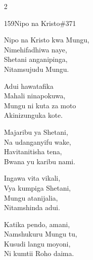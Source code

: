 \begin{multicols}{2}
\begin{hymn}{159}{Nipo na Kristo}{\#371}
\begin{stanza}
Nipo na Kristo kwa Mungu,\\
Nimehifadhiwa naye,\\
Shetani anganipinga,\\
Nitamsujudu Mungu.
\end{stanza}
\begin{chorus}
Adui hawatafika\\
Mahali ninapokuwa,\\
Mungu ni kuta za moto\\
Akinizunguka kote.
\end{chorus}
\begin{stanza}
Majaribu ya Shetani,\\
Na udanganyifu wake,\\
Havitanitisha tena,\\
Bwana yu karibu nami.
\end{stanza}
\begin{stanza}
Ingawa vita vikali,\\
Vya kumpiga Shetani,\\
Mungu atanijalia,\\
Nitamshinda adui.
\end{stanza}
\begin{stanza}
Katika pendo, amani,\\
Namshukuru Mungu tu,\\
Kusudi langu moyoni,\\
Ni kumtii Roho daima.
\end{stanza}
\end{hymn}


\end{multicols}
